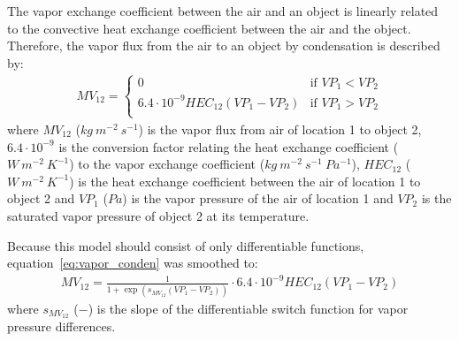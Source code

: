 \documentclass[a4paper]{article}
\numberwithin{equation}{section}
\begin{document}
The vapor exchange coefficient between the air and an object is linearly related to the convective heat exchange coefficient between the air and the object.
Therefore, the vapor flux from the air to an object by condensation is described by:
\begin{align}
  \label{eq:vapor_conden}
  MV_{12} = \begin{cases}
    0                                       & \text{if~} VP_1 < VP_2 \\
    6.4 \cdot 10^{-9} HEC_{12}(VP_1 - VP_2) & \text{if~} VP_1 > VP_2 \\
  \end{cases}
\end{align}
where \(MV_{12}\) (\(kg\ m^{-2}\ s^{-1}\)) is the vapor flux from air of location 1 to object 2, \(6.4 \cdot 10^{-9}\) is the conversion factor relating the heat exchange coefficient (\(W\ m^{-2}\ K^{-1}\)) to the vapor exchange coefficient (\(kg\ m^{-2}\ s^{-1}\ Pa^{-1}\)), \(HEC_{12}\) (\(W\ m^{-2}\ K^{-1}\)) is the heat exchange coefficient between the air of location 1 to object 2 and \(VP_1\) (\(Pa\)) is the vapor pressure of the air of location 1 and \(VP_2\) is the saturated vapor pressure of object 2 at its temperature.

Because this model should consist of only differentiable functions, equation~\eqref{eq:vapor_conden} was smoothed to:
\begin{align}
  MV_{12} = \frac{1}{1 + \exp \left(s_{MV_{12}} (VP_1 - VP_2)\right)} \cdot 6.4 \cdot 10^{-9} HEC_{12} (VP_1 - VP_2)
\end{align}
where \(s_{MV_{12}}\) (\(-\)) is the slope of the differentiable switch function for vapor pressure differences.
\end{document}
